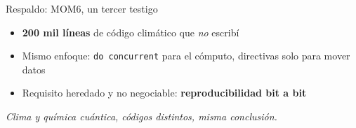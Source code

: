 \documentclass[aspectratio=169]{beamer}
\begin{document}
\appendix

\begin{frame}{Respaldo: MOM6, un tercer testigo}
  \begin{itemize}
    \item \textbf{200 mil líneas} de código climático que \emph{no} escribí
    \item Mismo enfoque: \texttt{do concurrent} para el cómputo, directivas solo para mover datos
    \item Requisito heredado y no negociable: \textbf{reproducibilidad bit a bit}
  \end{itemize}
  \vfill
  {\footnotesize\itshape Clima y química cuántica, códigos distintos, misma conclusión.}
\end{frame}
\end{document}
